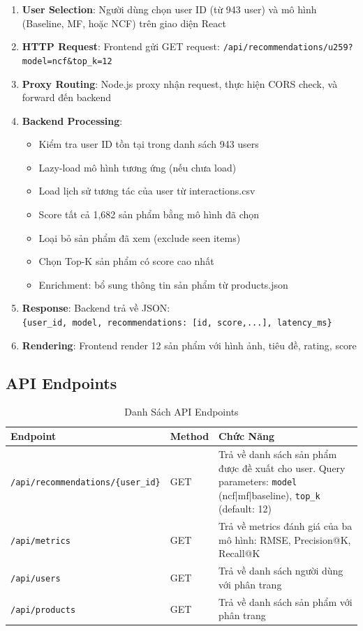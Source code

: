 \documentclass[12pt,a4paper]{article}
\begin{document}
\begin{enumerate}
    \item \textbf{User Selection}: Người dùng chọn user ID (từ 943 user) và mô hình (Baseline, MF, hoặc NCF) trên giao diện React
    \item \textbf{HTTP Request}: Frontend gửi GET request: \texttt{/api/recommendations/u259?model=ncf\&top\_k=12}
    \item \textbf{Proxy Routing}: Node.js proxy nhận request, thực hiện CORS check, và forward đến backend
    \item \textbf{Backend Processing}: 
    \begin{itemize}
        \item Kiểm tra user ID tồn tại trong danh sách 943 users
        \item Lazy-load mô hình tương ứng (nếu chưa load)
        \item Load lịch sử tương tác của user từ interactions.csv
        \item Score tất cả 1,682 sản phẩm bằng mô hình đã chọn
        \item Loại bỏ sản phẩm đã xem (exclude seen items)
        \item Chọn Top-K sản phẩm có score cao nhất
        \item Enrichment: bổ sung thông tin sản phẩm từ products.json
    \end{itemize}
    \item \textbf{Response}: Backend trả về JSON:\\ \texttt{\{user\_id, model, recommendations: [{id, score},...], latency\_ms\}}
    \item \textbf{Rendering}: Frontend render 12 sản phẩm với hình ảnh, tiêu đề, rating, score
\end{enumerate}

\subsection{API Endpoints}

\begin{table}[H]
\centering
\begin{tabular}{|p{3cm}|p{2cm}|p{8cm}|}
\hline
\textbf{Endpoint} & \textbf{Method} & \textbf{Chức Năng} \\
\hline
\texttt{/api/recommendations/\{user\_id\}} & GET & Trả về danh sách sản phẩm được đề xuất cho user. Query parameters: \texttt{model} (ncf|mf|baseline), \texttt{top\_k} (default: 12) \\
\hline
\texttt{/api/metrics} & GET & Trả về metrics đánh giá của ba mô hình: RMSE, Precision@K, Recall@K \\
\hline
\texttt{/api/users} & GET & Trả về danh sách người dùng với phân trang \\
\hline
\texttt{/api/products} & GET & Trả về danh sách sản phẩm với phân trang \\
\hline
\end{tabular}
\caption{Danh Sách API Endpoints}
\end{table}
\end{document}

